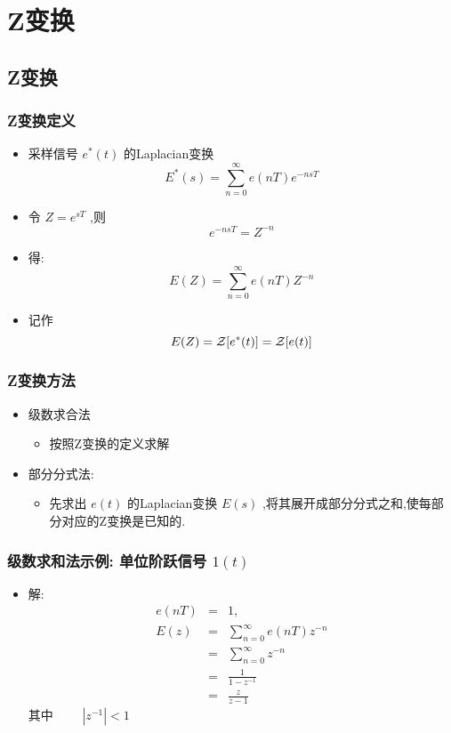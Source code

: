 \documentclass[table]{beamer}
\begin{document}
\section{Z变换}
\label{sec-3}
\subsection{Z变换}
\label{sec-3-1}
\begin{frame}
\frametitle{Z变换定义}
\label{sec-3-1-1}

\begin{itemize}
\item 采样信号  $e^*(t)$  的Laplacian变换  
       \[E^*(s)=\sum_{n=0}^{\infty}e(nT)e^{-nsT}\]
\item <2->令  $Z=e^{sT}$ ,则  
       \[e^{-nsT}=Z^{-n}\]
\item <3->得:  
       \[E(Z)=\sum_{n=0}^{\infty}e(nT)Z^{-n}\]
\item <3->记作  
       \[E(Z)={\cal Z}[e^*(t)]={\cal Z}[e(t)]\]
\end{itemize}
\end{frame}
\begin{frame}
\frametitle{Z变换方法}
\label{sec-3-1-2}

\begin{itemize}
\item 级数求合法
\begin{itemize}
\item 按照Z变换的定义求解
\end{itemize}
\item 部分分式法:
\begin{itemize}
\item 先求出  $e(t)$  的Laplacian变换  $E(s)$  ,将其展开成部分分式之和,使每部分对应的Z变换是已知的.
\end{itemize}
\end{itemize}
\end{frame}
\begin{frame}
\frametitle{级数求和法示例: 单位阶跃信号 $1(t)$}
\label{sec-3-1-3}

\begin{itemize}
\item <2-> 解: 
       \begin{eqnarray*}
       e(nT)&=&1 , \\
       E(z) &=  &\sum_{n=0}^{\infty}e(nT)z^{-n} \\
       	&=& \sum_{n=0}^{\infty}z^{-n} \\
       &=& \frac{1}{1-z^{-1}} \\
       &=& \frac{z}{z-1}
       \end{eqnarray*}
       其中  $\qquad |z^{-1}|<1$
\end{itemize}
\end{frame}
\end{document}
